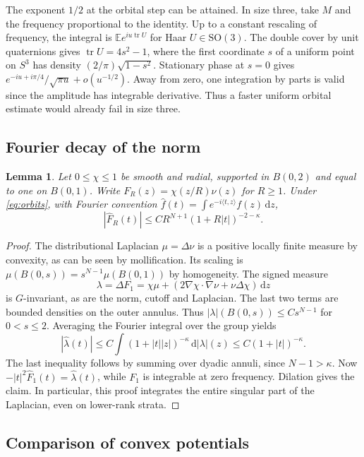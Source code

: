 \documentclass[10pt,letterpaper]{article}
\newtheorem{lemma}[theorem]{Lemma}
\newcommand{\E}{\mathbb E}
\newcommand{\ip}[2]{\langle #1,#2\rangle}
\newcommand{\SO}{\mathrm{SO}}
\newcommand{\tr}{\operatorname{tr}}
\newcommand{\dd}{\,\mathrm d}
\begin{document}
The exponent $1/2$ at the orbital step can be attained. In size three, take $M$ and the frequency proportional to the identity. Up to a constant rescaling of frequency, the integral is $\E e^{iu\tr U}$ for Haar $U\in\SO(3)$. The double cover by unit quaternions gives $\tr U=4s^2-1$, where the first coordinate $s$ of a uniform point on $S^3$ has density $(2/\pi)\sqrt{1-s^2}$. Stationary phase at $s=0$ gives $e^{-iu+i\pi/4}/\sqrt{\pi u}+o(u^{-1/2})$. Away from zero, one integration by parts is valid since the amplitude has integrable derivative. Thus a faster uniform orbital estimate would already fail in size three.

\subsection{Fourier decay of the norm}

\begin{lemma}\label{lem:laplace}
Let $0\le\chi\le1$ be smooth and radial, supported in $B(0,2)$ and equal to one on $B(0,1)$. Write $F_R(z)=\chi(z/R)\nu(z)$ for $R\ge1$. Under \eqref{eq:orbits}, with Fourier convention $\widehat f(t)=\int e^{-i\ip tz}f(z)\dd z$,
\[
 |\widehat F_R(t)|\le C R^{N+1}(1+R|t|)^{-2-\kappa}.
\]
\end{lemma}
\begin{proof}
The distributional Laplacian $\mu=\Delta\nu$ is a positive locally finite measure by convexity, as can be seen by mollification. Its scaling is $\mu(B(0,s))=s^{N-1}\mu(B(0,1))$ by homogeneity. The signed measure
\[
 \lambda=\Delta F_1=\chi\mu+(2\nabla\chi\cdot\nabla\nu+\nu\Delta\chi)\dd z
\]
is $G$-invariant, as are the norm, cutoff and Laplacian. The last two terms are bounded densities on the outer annulus. Thus $|\lambda|(B(0,s))\le C s^{N-1}$ for $0<s\le2$. Averaging the Fourier integral over the group yields
\[
 |\widehat\lambda(t)|\le C\int(1+|t||z|)^{-\kappa}\dd|\lambda|(z)
 \le C(1+|t|)^{-\kappa}.
\]
The last inequality follows by summing over dyadic annuli, since $N-1>\kappa$. Now $-|t|^2\widehat F_1(t)=\widehat\lambda(t)$, while $F_1$ is integrable at zero frequency. Dilation gives the claim. In particular, this proof integrates the entire singular part of the Laplacian, even on lower-rank strata.
\end{proof}

\subsection{Comparison of convex potentials}
\end{document}

